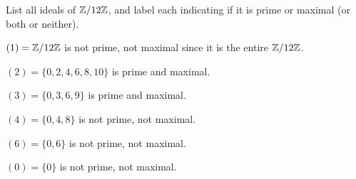 \begin{problem}
  List all ideals of $\mathbb{Z}/12\mathbb{Z}$, and label each indicating
  if it is prime or maximal (or both or neither).
\end{problem}
\begin{Answer}
  \begin{enumalph}
    \item $(1) = \mathbb{Z}/12\mathbb{Z}$ is not prime, not maximal since it is the entire $\mathbb{Z}/12\mathbb{Z}$.
    \item $(2) = \{0, 2, 4, 6, 8, 10\}$ is prime and maximal.
    \item $(3) = \{0, 3, 6, 9\}$ is prime and maximal.
    \item $(4) = \{0, 4, 8\}$ is not prime, not maximal.
    \item $(6) = \{0, 6\}$ is not prime, not maximal.
    \item $(0) = \{0\}$ is not prime, not maximal.
  \end{enumalph}
\end{Answer}
